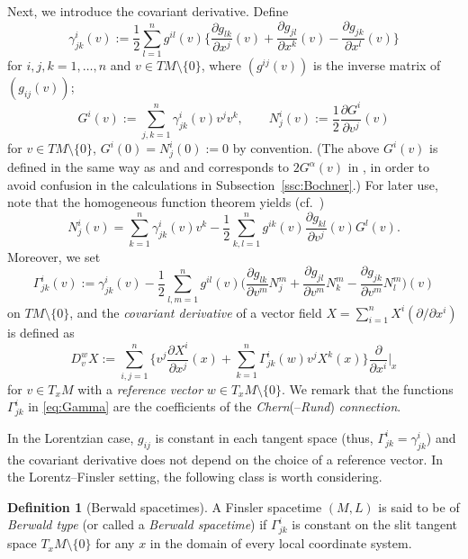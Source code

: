 \documentclass[a4paper,11pt]{article}
\numberwithin{equation}{section}
\theoremstyle{definition}
\newtheorem{definition}{Definition}[section]
\theoremstyle{plain}
\newcommand{\del}{\partial}
\begin{document}
Next, we introduce the covariant derivative.
Define
\[ \gamma^i_{jk} (v)
 :=\frac{1}{2} \sum_{l=1}^n g^{il}(v)
 \bigg\{ \frac{\del g_{lk}}{\del x^j}(v) +\frac{\del g_{jl}}{\del x^k}(v)
 -\frac{\del g_{jk}}{\del x^l}(v) \bigg\} \]
for $i,j,k =1,\ldots,n$ and $v \in TM\setminus \{0\}$,
where $(g^{ij}(v))$ is the inverse matrix of $(g_{ij}(v))$;
\[ G^i(v) :=\sum_{j,k=1}^n \gamma^i_{jk}(v) v^j v^k, \qquad
N^i_j(v) :=\frac{1}{2}\frac{\del G^i}{\del v^j}(v) \]
for $v \in TM \setminus \{0\}$, $G^i(0)=N^i_j(0):=0$ by convention.
(The above $G^i(v)$ is defined in the same way as  \cite{Obook} and \cite{OSbw} and corresponds to $2G^\alpha(v)$ in  \cite{LMO3}, in order to avoid confusion in the calculations in Subsection~\ref{ssc:Bochner}.)
For later use, note that the homogeneous function theorem yields (cf.\ \cite[Exercise~4.7]{Obook})
\begin{equation}\label{eq:N}
N^i_j(v) =\sum_{k=1}^n \gamma^i_{jk}(v)v^k -\frac{1}{2} \sum_{k,l=1}^n g^{ik}(v) \frac{\del g_{kl}}{\del v^j}(v) G^l(v).
\end{equation}
Moreover, we set
\begin{equation}\label{eq:Gamma}
\Gamma^i_{jk}(v):=\gamma^i_{jk}(v)
 -\frac{1}{2}\sum_{l,m=1}^n g^{il}(v)
 \bigg( \frac{\del g_{lk}}{\del v^m}N^m_j
 +\frac{\del g_{jl}}{\del v^m} N^m_k
 -\frac{\del g_{jk}}{\del v^m} N^m_l \bigg)(v)
\end{equation}
on $TM \setminus \{0\}$,
and the \emph{covariant derivative} of a vector field $X=\sum_{i=1}^n X^i (\del/\del x^i)$ is defined as
\[ D_v^w X :=\sum_{i,j=1}^n
 \Bigg\{ v^j \frac{\del X^i}{\del x^j}(x)
 +\sum_{k=1}^n \Gamma^i_{jk}(w) v^j X^k(x) \Bigg\}
 \frac{\del}{\del x^i} \bigg|_x \]
for $v \in T_xM$ with a \emph{reference vector} $w \in T_xM \setminus \{0\}$.
We remark that the functions $\Gamma^i_{jk}$ in \eqref{eq:Gamma} are the coefficients of the \emph{Chern}(--\emph{Rund}) \emph{connection}.

In the Lorentzian case, $g_{ij}$ is constant in each tangent space (thus, $\Gamma^i_{jk}=\gamma^i_{jk}$) and the covariant derivative does not depend on the choice of a reference vector.
In the Lorentz--Finsler setting, the following class is worth considering.

\begin{definition}[Berwald spacetimes]\label{df:Ber}
A Finsler spacetime $(M,L)$ is said to be of \emph{Berwald type} (or called a \emph{Berwald spacetime}) if $\Gamma^i_{jk}$ is constant on the slit tangent space $T_xM \setminus \{0\}$ for any $x$ in the domain of every local coordinate system.
\end{definition}
\end{document}
